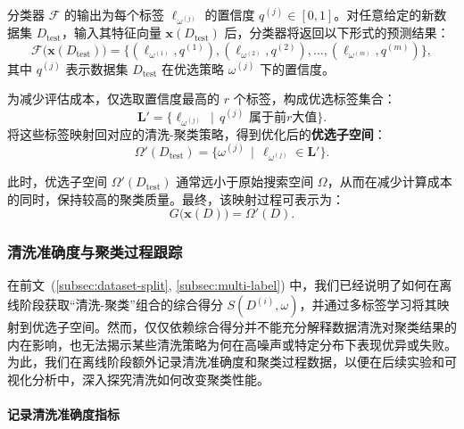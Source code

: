 \documentclass[10pt]{article} %
\numberwithin{equation}{section}
\begin{document}
分类器 $\mathcal{F}$ 的输出为每个标签 $\ell_{\omega^{(j)}}$ 的置信度 $q^{(j)} \in [0,1]$。对任意给定的新数据集 $D_{\text{test}}$，输入其特征向量 $\mathbf{x}(D_{\text{test}})$ 后，分类器将返回以下形式的预测结果：
\begin{equation}\label{eq:classifier}
\mathcal{F}\bigl(\mathbf{x}(D_{\text{test}})\bigr)
= \bigl\{(\ell_{\omega^{(1)}}, q^{(1)}), (\ell_{\omega^{(2)}}, q^{(2)}), \ldots, (\ell_{\omega^{(m)}}, q^{(m)})\bigr\},
\end{equation}
其中 $q^{(j)}$ 表示数据集 $D_{\text{test}}$ 在优选策略 $\omega^{(j)}$ 下的置信度。

为减少评估成本，仅选取置信度最高的 $r$ 个标签，构成优选标签集合：
\begin{equation}\label{eq:predicted-label-space}
\mathbf{L}' = \bigl\{\ell_{\omega^{(j)}} \,\mid\, q^{(j)} \text{ 属于前}r\text{大值}\bigr\}.
\end{equation}
将这些标签映射回对应的清洗-聚类策略，得到优化后的\textbf{优选子空间}：
\begin{equation}\label{eq:optimized-space}
\Omega'(D_{\text{test}})
= \bigl\{\omega^{(j)} \,\mid\, \ell_{\omega^{(j)}} \in \mathbf{L}'\bigr\}.
\end{equation}

此时，优选子空间 $\Omega'(D_{\text{test}})$ 通常远小于原始搜索空间 $\Omega$，从而在减少计算成本的同时，保持较高的聚类质量。最终，该映射过程可表示为：
\begin{equation}\label{eq:mapping-function}
G\bigl(\mathbf{x}(D)\bigr) = \Omega'(D).
\end{equation}

\subsubsection{清洗准确度与聚类过程跟踪}
\label{subsec:tracking}

在前文~(\ref{subsec:dataset-split}, \ref{subsec:multi-label}) 中，我们已经说明了如何在离线阶段获取“清洗-聚类”组合的综合得分 $S(D^{(i)}, \omega)$，并通过多标签学习将其映射到优选子空间。然而，仅仅依赖综合得分并不能充分解释数据清洗对聚类结果的内在影响，也无法揭示某些清洗策略为何在高噪声或特定分布下表现优异或失败。为此，我们在离线阶段额外记录清洗准确度和聚类过程数据，以便在后续实验和可视化分析中，深入探究清洗如何改变聚类性能。

\paragraph{记录清洗准确度指标}
\end{document}

